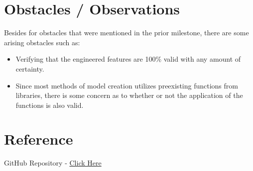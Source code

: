 \documentclass[11pt]{article}
\begin{document}
\section{Obstacles / Observations}
Besides for obstacles that were mentioned in the prior milestone, there are some arising obstacles such as:
\begin{itemize}
    \item Verifying that the engineered features are 100\% valid with any amount of certainty.
    \item Since most methods of model creation utilizes preexisting functions from libraries, there is some concern as to whether or not the application of the functions is also valid. 
\end{itemize}

\section{Reference}

GitHub Repository - \href{https://github.com/Sabuchan123/STAT-587-Final-Project/tree/main}{Click Here}
\end{document}
